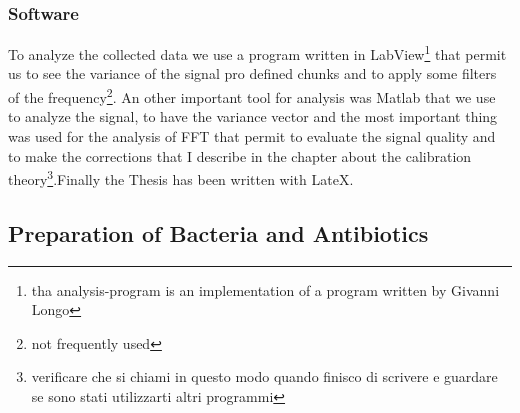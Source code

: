 \documentclass[11pt, a4paper]{article}
\begin{document}
\subsubsection{Software}%
To analyze the collected data we use a program written in LabView\footnote{tha analysis-program is an implementation of a program written by Givanni Longo} that permit us to see the variance of the signal pro defined chunks and to apply some filters of the frequency\footnote{not frequently used}. An other important tool for analysis was Matlab that we use to analyze the signal, to have the variance vector and the most important thing was used for the analysis of FFT that permit to evaluate the signal quality and to make the corrections that I describe in the chapter about the calibration theory\footnote{verificare che si chiami in questo modo quando finisco di scrivere e guardare se sono stati utilizzarti altri programmi}.Finally the Thesis has been written with LateX\cite{documento guida Latex}.

\subsection{Preparation of Bacteria and Antibiotics}%
\end{document}
